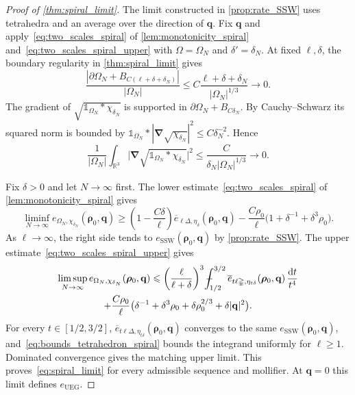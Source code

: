 \documentclass[final,reqno]{amsart}
\theoremstyle{remark}
\renewcommand{\le}{\leqslant}
\renewcommand{\ge}{\geqslant}
\newcommand{\ol}[1]{\overline{#1}}
\newcommand{\RR}{\mathbb{R}}
\newcommand{\UEG}{\mathrm{UEG}}
\newcommand{\SSW}{\mathrm{SSW}}
\newcommand{\iden}{\mathbb{1}}
\newcommand{\grad}{\bm{\nabla}}
\newcommand{\tetra}{\mathbb{\Delta}}
\newcommand{\dd}{\mathrm{d}}
\def\Xint#1{\mathchoice
{\XXint\displaystyle\textstyle{#1}}
{\XXint\textstyle\scriptstyle{#1}}
{\XXint\scriptstyle\scriptscriptstyle{#1}}
{\XXint\scriptscriptstyle\scriptscriptstyle{#1}}
\!\int}
\def\XXint#1#2#3{{\setbox0=\hbox{$#1{#2#3}{\int}$ }
\vcenter{\hbox{$#2#3$ }}\kern-.6\wd0}}
\def\dashint{\Xint-}
\begin{document}
\begin{proof}[Proof of \cref{thm:spiral_limit}]
The limit constructed in \cref{prop:rate_SSW} uses tetrahedra and an average over the direction of $\mathbf{q}$. Fix $\mathbf{q}$ and apply~\cref{eq:two_scales_spiral} of \cref{lem:monotonicity_spiral} and~\cref{eq:two_scales_spiral_upper} with $\Omega=\Omega_N$ and $\delta'=\delta_N$. At fixed $\ell,\delta$, the boundary regularity in \cref{thm:spiral_limit} gives
\[
 \frac{|\partial\Omega_N+B_{C(\ell+\delta+\delta_N)}|}{|\Omega_N|}
 \le C\frac{\ell+\delta+\delta_N}{|\Omega_N|^{1/3}}\longrightarrow0 .
\]
The gradient of $\sqrt{\iden_{\Omega_N}\ast\chi_{\delta_N}}$ is supported in $\partial\Omega_N+B_{C\delta_N}$. By Cauchy--Schwarz its squared norm is bounded by $\iden_{\Omega_N}\ast|\grad\sqrt{\chi_{\delta_N}}|^2\le C\delta_N^{-2}$. Hence
\[
 \frac{1}{|\Omega_N|}\int_{\RR^3}\big|\grad\sqrt{\iden_{\Omega_N}\ast\chi_{\delta_N}}\big|^2
 \le\frac{C}{\delta_N|\Omega_N|^{1/3}}\longrightarrow0 .
\]

Fix $\delta>0$ and let $N\to\infty$ first. The lower estimate~\cref{eq:two_scales_spiral} of \cref{lem:monotonicity_spiral} gives
\[
 \liminf_{N\to\infty}e_{\Omega_N,\chi_{\delta_N}}(\bm{\rho}_0,\mathbf{q})
 \ge \left(1-\frac{C\delta}{\ell}\right)\ol e_{\ell\tetra,\eta_\delta}(\bm{\rho}_0,\mathbf{q})-\frac{C\rho_0}{\ell}\big(1+\delta^{-1}+\delta^3\rho_0\big).
\]
As $\ell\to\infty$, the right side tends to $e_\SSW(\bm{\rho}_0,\mathbf{q})$ by \cref{prop:rate_SSW}. The upper estimate~\cref{eq:two_scales_spiral_upper} gives
\begin{multline*}
 \limsup_{N\to\infty}e_{\Omega_N,\chi_{\delta_N}}(\bm{\rho}_0,\mathbf{q})
 \le \left(\frac{\ell}{\ell+\delta}\right)^3
 \dashint_{1/2}^{3/2}\ol e_{t\ell\tetra,\eta_{t\delta}}(\bm{\rho}_0,\mathbf{q})\,\frac{\dd t}{t^4}\\
 +\frac{C\rho_0}{\ell}\big(\delta^{-1}+\delta^3\rho_0+\delta\rho_0^{2/3}+\delta|\mathbf{q}|^2\big).
\end{multline*}
For every $t\in[1/2,3/2]$, $\ol e_{t\ell\tetra,\eta_{t\delta}}(\bm{\rho}_0,\mathbf{q})$ converges to the same $e_\SSW(\bm{\rho}_0,\mathbf{q})$, and~\cref{eq:bounds_tetrahedron_spiral} bounds the integrand uniformly for $\ell\ge1$. Dominated convergence gives the matching upper limit. This proves~\cref{eq:spiral_limit} for every admissible sequence and mollifier. At $\mathbf{q}=0$ this limit defines $e_\UEG$.
\end{proof}
\end{document}
